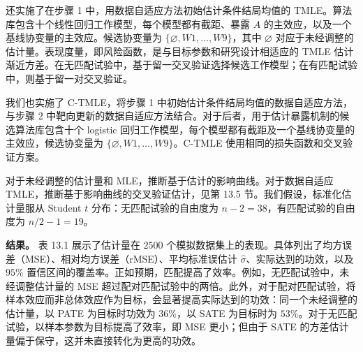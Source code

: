 还实施了在步骤 1 中，用数据自适应方法初始估计条件结局均值的 TMLE。算法库包含十个线性回归工作模型，每个模型都有截距、暴露 $A$ 的主效应，以及一个基线协变量的主效应。候选协变量为 $\{\varnothing,W1,\ldots,W9\}$，其中 $\varnothing$ 对应于未经调整的估计量。表现度量，即风险函数，是与目标参数和研究设计相适应的 TMLE 估计渐近方差。在无匹配试验中，基于留一交叉验证选择候选工作模型；在有匹配试验中，则基于留一对交叉验证。

我们也实施了 C-TMLE，将步骤 1 中初始估计条件结局均值的数据自适应方法，与步骤 2 中靶向更新的数据自适应方法结合。对于后者，用于估计暴露机制的候选算法库包含十个 logistic 回归工作模型，每个模型都有截距及一个基线协变量的主效应，候选协变量为 $\{\varnothing,W1,\ldots,W9\}$。C-TMLE 使用相同的损失函数和交叉验证方案。

对于未经调整的估计量和 MLE，推断基于估计的影响曲线。对于数据自适应 TMLE，推断基于影响曲线的交叉验证估计，见第 13.5 节。我们假设，标准化估计量服从 Student $t$ 分布：无匹配试验的自由度为 $n-2=38$，有匹配试验的自由度为 $n/2-1=19$。

\noindent\textbf{结果。}
表 13.1 展示了估计量在 $2500$ 个模拟数据集上的表现。具体列出了均方误差（MSE）、相对均方误差（rMSE）、平均标准误估计 $\hat\sigma$、实际达到的功效，以及 $95\%$ 置信区间的覆盖率。正如预期，匹配提高了效率。例如，无匹配试验中，未经调整估计量的 MSE 超过配对匹配试验中的两倍。此外，对于配对匹配试验，将样本效应而非总体效应作为目标，会显著提高实际达到的功效：同一个未经调整的估计量，以 PATE 为目标时功效为 $36\%$，以 SATE 为目标时为 $53\%$。对于无匹配试验，以样本参数为目标提高了效率，即 MSE 更小；但由于 SATE 的方差估计量偏于保守，这并未直接转化为更高的功效。

